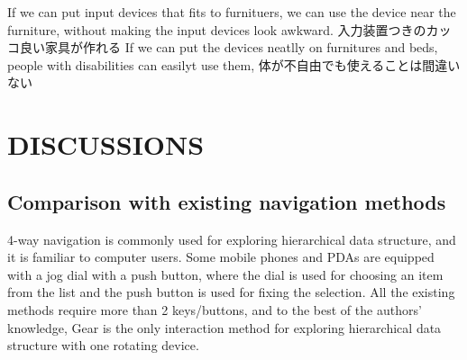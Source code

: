 \documentclass{article}
\begin{document}
If we can put input devices that fits to furnituers, we can use the device near the furniture, without making the input devices look awkward.
  入力装置つきのカッコ良い家具が作れる
 If we can put the devices neatlly on furnitures and beds, people with disabilities can easilyt use them, 
 体が不自由でも使えることは間違いない


\section*{DISCUSSIONS}

\subsection{Comparison with existing navigation methods}

4-way navigation is commonly used for exploring hierarchical data structure,
and it is familiar to computer users.
Some mobile phones and PDAs are equipped with a jog dial with a push button,
where the dial is used for choosing an item from the list and 
the push button is used for fixing the selection.
All the existing methods require more than 2 keys/buttons, and
to the best of the authors' knowledge,
Gear is the only interaction method for exploring hierarchical data structure
with one rotating device.
\end{document}
